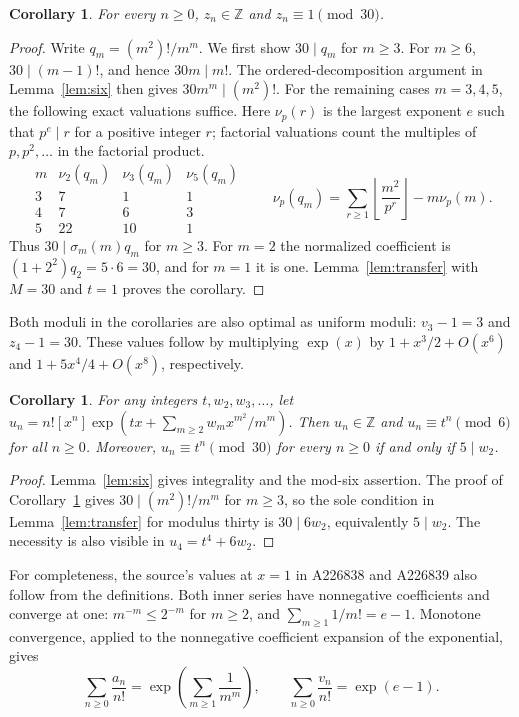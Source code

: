 \documentclass[11pt]{article}
\newtheorem{corollary}[theorem]{Corollary}
\DeclareMathOperator{\ex}{exp}
\begin{document}
\begin{corollary}\label{cor:weighted}
For every $n\geq0$, $z_n\in\mathbb Z$ and $z_n\equiv1\pmod{30}$.
\end{corollary}
\begin{proof}
Write $q_m=(m^2)!/m^m$. We first show $30\mid q_m$ for $m\geq3$.
For $m\geq6$, $30\mid(m-1)!$, and hence $30m\mid m!$.
The ordered-decomposition argument in Lemma~\ref{lem:six} then gives
$30m^m\mid(m^2)!$.
For the remaining cases $m=3,4,5$, the following exact valuations suffice.
Here $\nu_p(r)$ is the largest exponent $e$ such that $p^e\mid r$
for a positive integer $r$; factorial valuations count the multiples of
$p,p^2,\ldots$ in the factorial product.
\[
\begin{array}{c|ccc}
 m&\nu_2(q_m)&\nu_3(q_m)&\nu_5(q_m)\\\hline
 3&7&1&1\\
 4&7&6&3\\
 5&22&10&1
\end{array}
\qquad
 \nu_p(q_m)=\sum_{r\geq1}\left\lfloor\frac{m^2}{p^r}\right\rfloor
                         -m\nu_p(m).
\]
Thus $30\mid\sigma_m(m)q_m$ for $m\geq3$.
For $m=2$ the normalized coefficient is $(1+2^2)q_2=5\cdot6=30$,
and for $m=1$ it is one. Lemma~\ref{lem:transfer} with $M=30$ and $t=1$
proves the corollary.
\end{proof}

Both moduli in the corollaries are also optimal as uniform moduli:
$v_3-1=3$ and $z_4-1=30$. These values follow by multiplying
$\ex(x)$ by $1+x^3/2+O(x^6)$ and $1+5x^4/4+O(x^8)$, respectively.

\begin{corollary}\label{cor:sharpweights}
For any integers $t,w_2,w_3,\ldots$, let
$u_n=n![x^n]\exp(tx+\sum_{m\geq2}w_m x^{m^2}/m^m)$.
Then $u_n\in\mathbb Z$ and $u_n\equiv t^n\pmod6$ for all $n\geq0$.
Moreover, $u_n\equiv t^n\pmod{30}$ for every $n\geq0$
if and only if $5\mid w_2$.
\end{corollary}
\begin{proof}
Lemma~\ref{lem:six} gives integrality and the mod-six assertion.
The proof of Corollary~\ref{cor:weighted} gives $30\mid(m^2)!/m^m$
for $m\geq3$, so the sole condition in Lemma~\ref{lem:transfer}
for modulus thirty is $30\mid6w_2$, equivalently $5\mid w_2$.
The necessity is also visible in $u_4=t^4+6w_2$.
\end{proof}

For completeness, the source's values at $x=1$ in A226838 and A226839
also follow from the definitions. Both inner series have nonnegative
coefficients and converge at one: $m^{-m}\leq2^{-m}$ for $m\geq2$,
and $\sum_{m\geq1}1/m!=e-1$. Monotone convergence, applied to the
nonnegative coefficient expansion of the exponential, gives
\[
 \sum_{n\geq0}\frac{a_n}{n!}
   =\exp\!\left(\sum_{m\geq1}\frac1{m^m}\right),\qquad
 \sum_{n\geq0}\frac{v_n}{n!}=\exp(e-1).
\]
\end{document}
